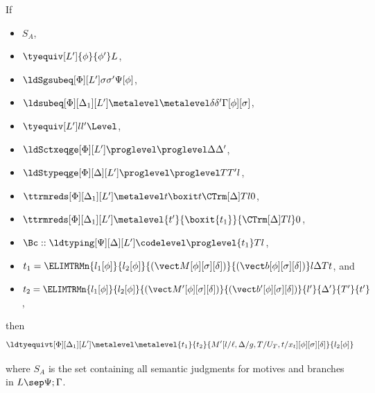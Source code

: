 \begin{lemma}
  If
  \begin{itemize}
  \item $S_A$,
  \item $\tyequiv[L']{\phi}{\phi'}L$,
  \item $\ldSgsubeq[\Phi][L'] \sigma{\sigma'}{\Psi[\phi]}$,
  \item $\ldsubeq[\Phi][\Delta_1][L'] \metalevel \metalevel \delta{\delta'}{\Gamma[\phi][\sigma]}$,
  \item $\tyequiv[L']l{l'}\Level$,
  \item $\ldSctxeqge[\Phi][L']\proglevel \proglevel\Delta{\Delta'}$,
  \item $\ldStypeqge[\Phi][\Delta][L'] \proglevel \proglevel T{T'} l$,
  \item $\ttrmreds[\Phi][\Delta_1][L'] \metalevel t{\boxit t} {\CTrm[\Delta] T l} 0$,
  \item $\ttrmreds[\Phi][\Delta_1][L'] \metalevel{t'}{\boxit{t_1}}{\CTrm[\Delta] T l} 0$,
  \item $\Bc :: \ldtyping[\Psi][\Delta][L'] \codelevel \proglevel {t_1}T l$,
  \item
    $t_1 = \ELIMTRMn{l_1[\phi]}{l_2[\phi]}{(\vect M[\phi][\sigma][\delta])}{(\vect
      b[\phi][\sigma][\delta])}l \Delta T t$, and
  \item
    $t_2 = \ELIMTRMn{l_1[\phi]}{l_2[\phi]}{(\vect M'[\phi][\sigma][\delta])}{(\vect
      b'[\phi][\sigma][\delta])}{l'}{\Delta'}{T'}{t'}$,
  \end{itemize}
  then
  \[
    \ldtyequivt[\Phi][\Delta_1][L'] \metalevel \metalevel{t_1}{t_2}{M'[l/\ell,\Delta/g,T/U_T,t/x_t][\phi][\sigma][\delta]}{l_2[\phi]}
  \]
\end{lemma}
where $S_A$ is the set containing all semantic judgments for motives and branches in
$L \sep \Psi; \Gamma$.
